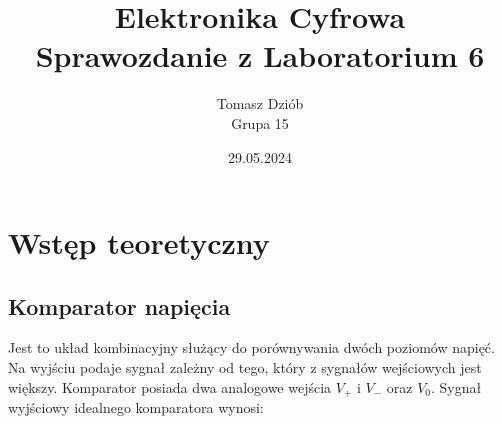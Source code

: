 \documentclass{article}
\begin{document}
  \pagestyle{fancy} %
  \fancyhf{} %
  \fancyfoot[C]{\thepage}
  \renewcommand{\headrulewidth}{0pt} %
  \renewcommand{\footrulewidth}{0.4pt} %
  \addtolength{\footskip}{0cm} %

  \title{Elektronika Cyfrowa \\ {\large Sprawozdanie z Laboratorium 6}}
  \date{29.05.2024}
  \author{Tomasz Dziób\\{\small Grupa 15}}
  \maketitle

  \setcounter{tocdepth}{4} %
  \setcounter{secnumdepth}{4} %
  \small \tableofcontents
  \pagebreak

  \section{Wstęp teoretyczny}
    \subsection{Komparator napięcia}
      Jest to układ kombinacyjny służący do porównywania dwóch poziomów napięć. Na wyjściu podaje sygnał zależny od tego, który z sygnałów wejściowych jest większy. Komparator posiada dwa analogowe wejścia $V_{+}$ i $V_{-}$ oraz $V_{0}$. Sygnał wyjściowy idealnego komparatora wynosi: \\
\end{document}
